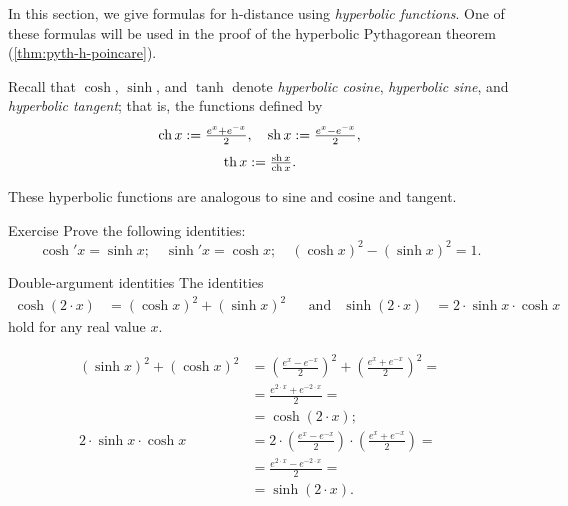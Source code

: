 In this section, we give formulas for h-distance using \emph{hyperbolic functions}.
One of these formulas will be used in the proof of the hyperbolic Pythagorean theorem (\ref{thm:pyth-h-poincare}).

Recall that $\cosh$, $\sinh$, and $\tanh$ denote \emph{hyperbolic cosine}, \emph{hyperbolic sine}, and \emph{hyperbolic tangent}\label{hyperbolic tangent};
that is, the functions defined by
\[\operatorname{ch} x:= \tfrac{e^x+e^{-x}}2,
 \quad
 \operatorname{sh} x:= \tfrac{e^x-e^{-x}}2,
\]
\[\operatorname{th} x:= \tfrac{\operatorname{sh} x}{\operatorname{ch} x}.
\]

These hyperbolic functions are analogous to sine and cosine and tangent. 

\begin{thm}{Exercise}\label{ex:hyp-fun}
Prove the following identities:
\[\cosh' x=\sinh x;\quad \sinh'x=\cosh x;\quad (\cosh x)^2-(\sinh x)^2=1.\]
\end{thm}

\begin{thm}{Double-argument identities}\label{double-argument}
The identities
\begin{align*}
\cosh (2\cdot x)&=(\cosh x)^2+(\sinh x)^2 
&&\text{and}&
\sinh (2\cdot x)&=2\cdot\sinh x\cdot \cosh x
\end{align*}
hold for any real value $x$.
\end{thm}

\begin{align*}
(\sinh x)^2+(\cosh x)^2
&=(\tfrac{e^x-e^{-x}}2)^2+(\tfrac{e^x+e^{-x}}2)^2=
\\
&=\tfrac{e^{2\cdot x}+e^{-2\cdot x}}2=
\\
&=\cosh (2\cdot x);
\\
2\cdot\sinh x\cdot \cosh x
&=2\cdot(\tfrac{e^x-e^{-x}}2)\cdot(\tfrac{e^x+e^{-x}}2)=
\\
&=\tfrac{e^{2\cdot x}-e^{-2\cdot x}}2=
\\
&=\sinh (2\cdot x).
\end{align*}
\qedsf

